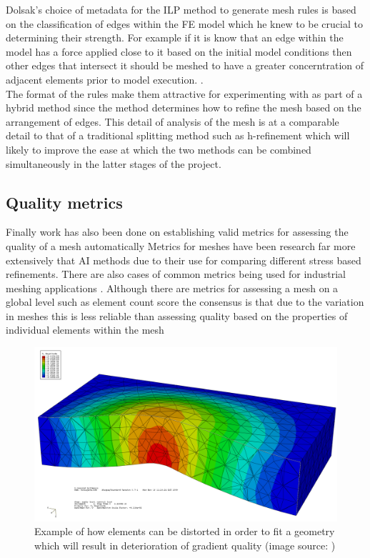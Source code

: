 \documentclass{article}
\begin{document}
\noindent
Dolsak's choice of metadata for the ILP method to generate mesh rules is based on the classification of edges within the FE model which he knew to be crucial to determining their strength. For example if it is know that an edge within the model has a force applied close to it based on the initial model conditions then other edges that intersect it should be meshed to have a greater concerntration of adjacent elements prior to model execution. \cite{DolsakPaper91} \cite{appOfILPToFEMeshDesign}.\\ 

\noindent
The format of the rules make them attractive for experimenting with as part of a hybrid method since the method determines how to refine the mesh based on the arrangement of edges. This detail of analysis of the mesh is at a comparable detail to that of a traditional splitting method such as h-refinement which will likely to improve the ease at which the two methods can be combined simultaneously in the latter stages of the project. \\ 

\subsection{Quality metrics}
\noindent
Finally work has also been done on establishing valid metrics for assessing the quality of a mesh automatically \cite{DittmerMeshQualityMet, NeuralNetworks} Metrics for meshes have been research far more extensively that AI methods due to their use for comparing different stress based refinements. There are also cases of common metrics being used for industrial meshing applications \cite{DittmerMeshQualityMet}. Although there are metrics for assessing a mesh on a global level such as element count score \cite{DittmerMeshQualityMet} the consensus is that due to the variation in meshes this is less reliable than assessing quality based on the properties of individual elements within the mesh \cite{DittmerMeshQualityMet} \\

\begin{figure}
  \centerline{\includegraphics[width=120mm, scale=1]{MeshQualityDeterioration.png}}
  \caption{Example of how elements can be distorted in order to fit a geometry which will result in deterioration of gradient quality (image source: \cite{PoorFEElementShapes})}
\end{figure}
\end{document}
